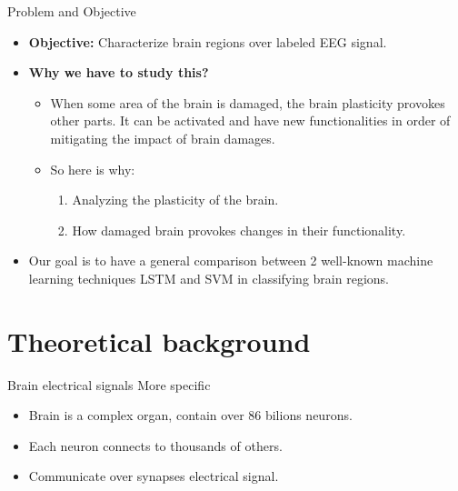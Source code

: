 \documentclass[xcolor=dvipsnames]{beamer} %
\begin{document}
	\begin{frame}{Problem and Objective}
	    \begin{itemize}
	        \item \textbf{Objective: }Characterize brain regions over labeled EEG signal.
	        \item \textbf{Why we have to study this?}
	        \begin{itemize}
	            \item When some area of the brain is damaged, the brain plasticity provokes other parts. It can be activated and have new functionalities in order of mitigating the impact of brain damages. 
	            \item So here is why:
	            \begin{enumerate}
	                \item Analyzing the plasticity of the brain.
	                \item How damaged brain provokes changes in their functionality.
	            \end{enumerate}
	        \end{itemize}
	        \item Our goal is to have a general comparison between 2 well-known machine learning techniques LSTM and SVM in classifying brain regions. 
	    \end{itemize}
	\end{frame}
	
	\section{Theoretical background}
	
	\begin{frame}{Brain electrical signals}
	More specific
		\begin{itemize}
		    \item Brain is a complex organ, contain over 86 bilions neurons.
		    \item Each neuron connects to thousands of others.
		    \item Communicate over synapses electrical signal.
		\end{itemize}
	\end{frame}
    
\end{document}
